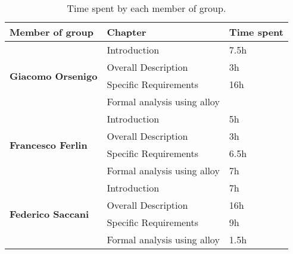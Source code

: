 \begin{table}[H]
      \centering
      \begin{tabular}{|l|l|l|}
            \hline
            \textbf{Member of group }                  & \textbf{Chapter}            & \textbf{Time spent} \\\hline
            \multirow{4}{*}{\textbf{Giacomo Orsenigo}} & Introduction                & 7.5h                \\
                                                       & Overall Description         & 3h                  \\
                                                       & Specific Requirements       & 16h                 \\
                                                       & Formal analysis using alloy &                     \\\hline
            \multirow{4}{*}{\textbf{Francesco Ferlin}} & Introduction                & 5h                  \\
                                                       & Overall Description         & 3h                  \\
                                                       & Specific Requirements       & 6.5h                \\
                                                       & Formal analysis using alloy & 7h                  \\\hline
            \multirow{4}{*}{\textbf{Federico Saccani}} & Introduction                & 7h                  \\
                                                       & Overall Description         & 16h                \\
                                                       & Specific Requirements       & 9h                \\
                                                       & Formal analysis using alloy & 1.5h                    \\\hline
      \end{tabular}
      \caption{Time spent by each member of group.}
      \label{table:Time spent}
\end{table}
